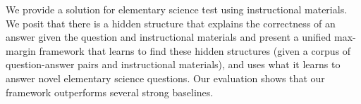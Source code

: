 We provide a solution for elementary science test using instructional materials. We posit that there is a hidden structure that explains the correctness of an answer given the question and instructional materials and present a unified max-margin framework that learns to find these hidden structures (given a corpus of question-answer pairs and instructional materials), and uses what it learns to answer novel elementary science questions. Our evaluation shows that our framework outperforms several strong baselines.
